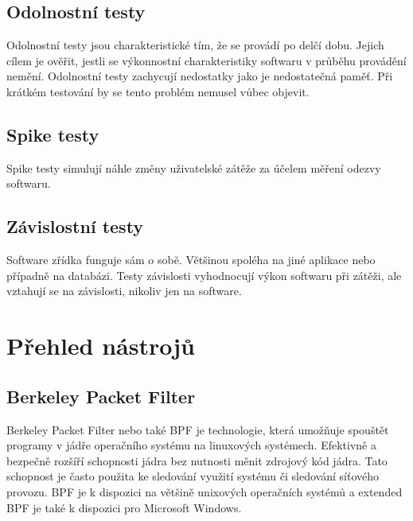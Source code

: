 \subsection*{Odolnostní testy}

Odolnostní testy jsou charakteristické tím, že se provádí po delčí dobu. Jejich cílem je ověřit, jestli se výkonnostní charakteristiky softwaru v průběhu provádění nemění. Odolnostní testy
zachycují nedostatky jako je nedostatečná paměť. Při krátkém testování by se tento problém nemusel vůbec objevit.

\subsection*{Spike testy}

Spike testy simulují náhle změny uživatelské zátěže za účelem měření odezvy softwaru.

\subsection*{Závislostní testy}

Software zřídka funguje sám o sobě. Většinou spoléha na jiné aplikace nebo případně na databázi. Testy závislosti vyhodnocují výkon softwaru při zátěži, ale vztahují se na závislosti, nikoliv
jen na software.

\section{Přehled nástrojů}

\subsection{Berkeley Packet Filter}

Berkeley Packet Filter nebo také BPF je technologie, která umožňuje spouštět programy v jádře operačního systému na linuxových systémech.
Efektivně a bezpečně rozšíří schopnosti jádra bez nutnosti měnit zdrojový kód jádra. Tato schopnost je často použita ke sledování využití systému či sledování síťového provozu.
BPF je k dispozici na většině unixových operačních systémů a extended BPF je také k dispozici pro Microsoft Windows.

